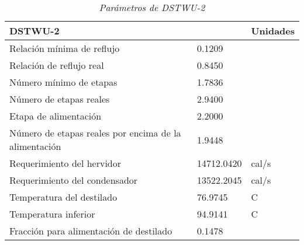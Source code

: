 \begin{table}[H]
    \centering
    \caption{\textit{Parámetros de DSTWU-2}}
    \label{Parametros_DSTWU-2}
    \begin{tabular}{lll}
    \hline
    \multicolumn{2}{l}{DSTWU-2}                      & Unidades    \\ \hline
    Relación mínima de reflujo         & 0.1209     &          \\
    Relación de reflujo real           & 0.8450     &          \\
    Número mínimo de etapas            & 1.7836     &          \\
    Número de etapas reales            & 2.9400     &          \\
    Etapa de alimentación              & 2.2000     &          \\
    Número de etapas reales por encima de la alimentación & 1.9448     &
    \\Requerimiento del hervidor    & 14712.0420 & cal/s \\
    Requerimiento del condensador         & 13522.2045 & cal/s  \\
    Temperatura del destilado          & 76.9745    & C        \\
    Temperatura inferior                & 94.9141    & C        \\
    Fracción para alimentación de destilado       & 0.1478     &   \\ \hline
    \end{tabular}
\end{table}